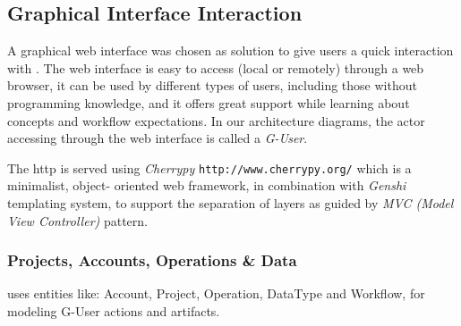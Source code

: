 \subsection{Graphical Interface Interaction}

    A graphical web interface was chosen as solution to give users a quick
    interaction with \TVB  . The web interface is easy to access (local or
    remotely) through a web browser, it can be used by different types of
    users, including those without programming knowledge, and it offers
    great support while learning about \TVB concepts and workflow
    expectations.  In our architecture diagrams, the actor accessing \TVB
    through the web interface is called a \emph{G-User}.

    The http is served using \emph{Cherrypy}
    \texttt{http://www.cherrypy.org/} which is a minimalist, object-
    oriented web framework,  in combination with \emph{Genshi} templating
    system, to support the separation of layers as guided by \emph{MVC
    (Model View Controller)} pattern.

    \subsubsection{Projects, Accounts, Operations \& Data}

\TVB uses entities like: Account, Project, Operation, DataType and Workflow, for modeling G-User actions and artifacts. 

